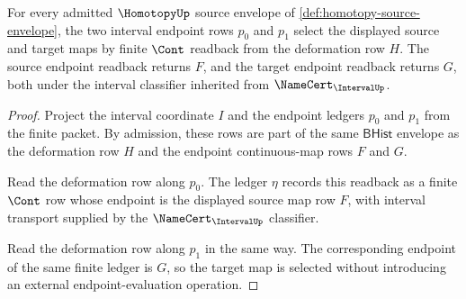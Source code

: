 \begin{theorem}
\label{thm:homotopy-interval-endpoint-obligation-surface}
For every admitted $\HomotopyUp$ source envelope of \autoref{def:homotopy-source-envelope}, the two interval endpoint rows $p_0$ and $p_1$ select the displayed source and target maps by finite $\Cont$ readback from the deformation row $H$. The source endpoint readback returns $F$, and the target endpoint readback returns $G$, both under the interval classifier inherited from $\NameCert_{\IntervalUp}$.
\end{theorem}
\begin{proof}
Project the interval coordinate $I$ and the endpoint ledgers $p_0$ and $p_1$ from the finite packet. By admission, these rows are part of the same $\mathsf{BHist}$ envelope as the deformation row $H$ and the endpoint continuous-map rows $F$ and $G$.

Read the deformation row along $p_0$. The ledger $\eta$ records this readback as a finite $\Cont$ row whose endpoint is the displayed source map row $F$, with interval transport supplied by the $\NameCert_{\IntervalUp}$ classifier.

Read the deformation row along $p_1$ in the same way. The corresponding endpoint of the same finite ledger is $G$, so the target map is selected without introducing an external endpoint-evaluation operation.
\end{proof}

